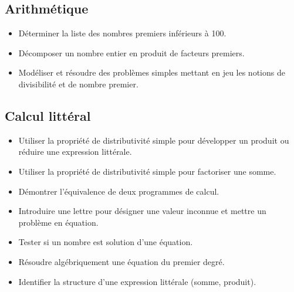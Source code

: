 \documentclass[a4paper,12pt,fleqn]{article}	
\begin{document}
\subsection*{Arithmétique}

\begin{itemize}
	\item {}Déterminer la liste des nombres premiers inférieurs à 100.
	\item {}Décomposer un nombre entier en produit de facteurs premiers.
	\item {}Modéliser et résoudre des problèmes simples mettant en jeu les notions de divisibilité et de nombre premier.
\end{itemize}

\subsection*{Calcul littéral}

\begin{itemize}
	\item {}Utiliser la propriété de distributivité simple pour développer un produit ou réduire une expression littérale.
	\item {}Utiliser la propriété de distributivité simple pour factoriser une somme.
	\item {}Démontrer l’équivalence de deux programmes de calcul.
	\item {}Introduire une lettre pour désigner une valeur inconnue et mettre un problème en équation.
	\item {}Tester si un nombre est solution d’une équation.
	\item {}Résoudre algébriquement une équation du premier degré.
	\item {}Identifier la structure d’une expression littérale (somme, produit).
\end{itemize}

	
\end{document}

